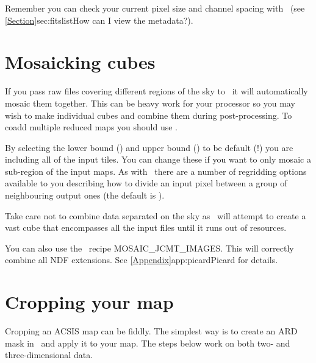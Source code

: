 \documentclass[11pt,oneside,chapters]{starlink}
\begin{document}
Remember you can check your current pixel size and channel spacing
with \ndftrace\ (see \cref{Section}{sec:fitslist}{How can I view the
metadata?}).

\section{Mosaicking cubes}
\label{sec:mosaic}
If you pass raw files covering different regions of the sky to
\makecube\ it will automatically mosaic them together. This can be
heavy work for your processor so you may wish to make individual cubes
and combine them during post-processing. To coadd multiple reduced
maps you should use \wcsmosaic.

\begin{terminalv}
\end{terminalv}
By selecting the lower bound () and upper bound
() to be default (!) you are including all of the input
tiles. You can change these if you want to only mosaic a sub-region of
the input maps. As with \makecube\ there are a number of regridding
options available to you describing how to divide an input pixel
between a group of neighbouring output ones (the default is
).


\begin{tip}
Take care not to combine data separated on the sky as \wcsmosaic\
will attempt to create a vast cube that encompasses all the input
files until it runs out of resources.
\end{tip}

\begin{tip}
You can also use the \picard\ recipe MOSAIC\_JCMT\_IMAGES. This
will correctly combine all NDF extensions. See
\cref{Appendix}{app:picard}{Picard} for details.
\end{tip}


\section{Cropping your map}
\label{sec:collapse}

Cropping an ACSIS map can be fiddly. The simplest way is to create an
ARD mask in \gaia\ and apply it to your map. The steps below work on
both two- and three-dimensional data.
\end{document}
